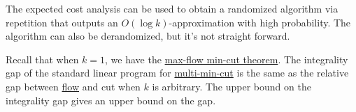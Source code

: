 The expected cost analysis can be used to obtain a randomized algorithm via repetition that outputs an \(O(\log k)\)-approximation with high probability. The algorithm can also be derandomized, but it's not straight forward.

\begin{remark}
	Recall that when \(k = 1\), we have the \hyperref[thm:max-flow-min-cut]{max-flow min-cut theorem}. The integrality gap of the standard linear program for \hyperref[prb:multi-min-cut]{multi-min-cut} is the same as the relative gap between \hyperref[def:flow]{flow} and cut when \(k\) is arbitrary. The upper bound on the integrality gap gives an upper bound on the gap.
\end{remark}
